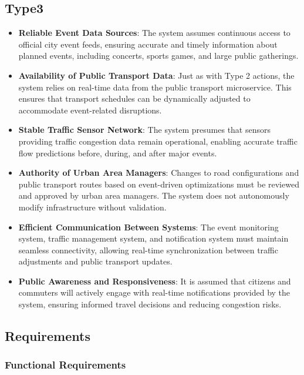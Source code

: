 \documentclass[a4paper,12pt]{article}
\begin{document}
\subsection*{Type3}
\begin{itemize}
    \item \textbf{Reliable Event Data Sources}: The system assumes continuous access to official city event feeds, ensuring accurate and timely information about planned events, including concerts, sports games, and large public gatherings.
    \item \textbf{Availability of Public Transport Data}: Just as with Type 2 actions, the system relies on real-time data from the public transport microservice. This ensures that transport schedules can be dynamically adjusted to accommodate event-related disruptions.
    \item \textbf{Stable Traffic Sensor Network}: The system presumes that sensors providing traffic congestion data remain operational, enabling accurate traffic flow predictions before, during, and after major events.
    \item \textbf{Authority of Urban Area Managers}: Changes to road configurations and public transport routes based on event-driven optimizations must be reviewed and approved by urban area managers. The system does not autonomously modify infrastructure without validation.
    \item \textbf{Efficient Communication Between Systems}: The event monitoring system, traffic management system, and notification system must maintain seamless connectivity, allowing real-time synchronization between traffic adjustments and public transport updates.
    \item \textbf{Public Awareness and Responsiveness}: It is assumed that citizens and commuters will actively engage with real-time notifications provided by the system, ensuring informed travel decisions and reducing congestion risks.
\end{itemize}

\newpage

\subsection{Requirements}
\subsubsection{Functional Requirements}
\end{document}
